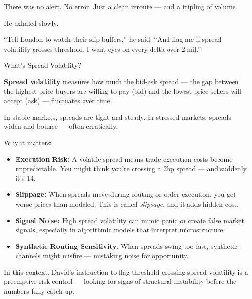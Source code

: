 There was no alert.
No error.
Just a clean reroute — and a tripling of volume.

He exhaled slowly.

“Tell London to watch their slip buffers,” he said. “And flag me if spread volatility crosses threshold. I want eyes on 
every delta over 2 mil.”

\medskip

\begin{TechnicalSidebar}{What’s Spread Volatility?}

  \textbf{Spread volatility} measures how much the bid-ask spread — the gap between the highest price buyers are willing 
  to pay (bid) and the lowest price sellers will accept (ask) — fluctuates over time.
  
  \medskip
  
  In stable markets, spreads are tight and steady.  
  In stressed markets, spreads widen and bounce — often erratically.
  
  \medskip
  
  Why it matters:

  \medskip
  
  \begin{itemize}
    \item \textbf{Execution Risk:} A volatile spread means trade execution costs become unpredictable. You might think 
    you're crossing a 2bp spread — and suddenly it's 14.
    
    \item \textbf{Slippage:} When spreads move during routing or order execution, you get worse prices than modeled. 
    This is called \textit{slippage}, and it adds hidden cost.
    
    \item \textbf{Signal Noise:} High spread volatility can mimic panic or create false market signals, especially in 
    algorithmic models that interpret microstructure.
  
    \item \textbf{Synthetic Routing Sensitivity:} When spreads swing too fast, synthetic channels might misfire — mistaking 
    noise for opportunity.
  \end{itemize}
  
  \medskip
  
  In this context, David’s instruction to flag threshold-crossing spread volatility is a preemptive risk control — looking for signs of structural instability before the numbers fully catch up.
  
\end{TechnicalSidebar}

